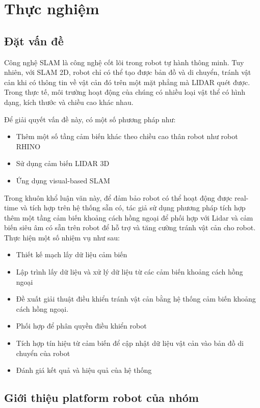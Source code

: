 \chapter{Thực nghiệm}

\section{Đặt vấn đề}

Công nghệ SLAM là công nghệ cốt lõi trong robot tự hành thông minh. Tuy nhiên, với SLAM 2D, robot chỉ có thể tạo được bản đồ và di chuyển, tránh vật cản khi có thông tin về vật cản đó trên một mặt phẳng mà LIDAR quét được. Trong thực tế, môi trường hoạt động của chúng có nhiều loại vật thể có hình dạng, kích thước và chiều cao khác nhau.

Để giải quyết vấn đề này, có một số phương pháp như:
\begin{itemize}
    \item Thêm một số tầng cảm biến khác theo chiều cao thân robot như robot RHINO
    \item Sử dụng cảm biến LIDAR 3D
    \item Ứng dụng visual-based SLAM
\end{itemize}

Trong khuôn khổ luận văn này, để đảm bảo robot có thể hoạt động được real-time và tích hợp trên hệ thống sẵn có, tác giả sử dụng phương pháp tích hợp thêm một tầng cảm biến khoảng cách hồng ngoại để phối hợp với Lidar và cảm biến siêu âm có sẵn trên robot để hỗ trợ và tăng cường tránh vật cản cho robot. Thực hiện một số nhiệm vụ như sau:
\begin{itemize}
    \item Thiết kế mạch lấy dữ liệu cảm biến
    \item Lập trình lấy dữ liệu và xử lý dữ liệu từ các cảm biến khoảng cách hồng ngoại
    \item Đề xuất giải thuật điều khiển tránh vật cản bằng hệ thống cảm biến khoảng cách hồng ngoại.
    \item Phối hợp để phân quyền điều khiển robot
    \item Tích hợp tín hiệu từ cảm biến để cập  nhật dữ liệu vật cản vào bản đồ di chuyển của robot
    \item Đánh giá kết quả và hiệu quả của hệ thống
\end{itemize}

\section{Giới thiệu platform robot của nhóm}
\label{sec:RobotIntro}

